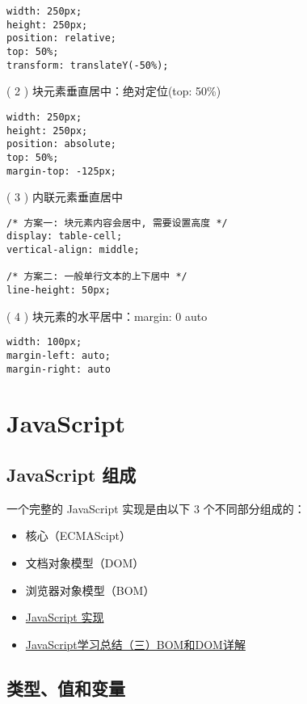 \begin{lstlisting}
width: 250px;
height: 250px;
position: relative;
top: 50%;
transform: translateY(-50%);
\end{lstlisting}

( 2 ) 块元素垂直居中：绝对定位(top: 50\%)

\begin{lstlisting}
width: 250px;
height: 250px;
position: absolute;
top: 50%;
margin-top: -125px;
\end{lstlisting}

( 3 ) 内联元素垂直居中

\begin{lstlisting}
/* 方案一: 块元素内容会居中, 需要设置高度 */
display: table-cell;
vertical-align: middle;

/* 方案二: 一般单行文本的上下居中 */
line-height: 50px;
\end{lstlisting}

( 4 ) 块元素的水平居中：margin: 0 auto

\begin{lstlisting}
width: 100px;
margin-left: auto;
margin-right: auto
\end{lstlisting}

\section{JavaScript}\label{javascript}

\subsection{JavaScript 组成}\label{javascript-ux7ec4ux6210}

一个完整的 JavaScript 实现是由以下 3 个不同部分组成的：

\begin{itemize}
\item
  核心（ECMAScipt）
\item
  文档对象模型（DOM）
\item
  浏览器对象模型（BOM）
\item
  \href{http://www.w3school.com.cn/js/pro_js_implement.asp}{JavaScript
  实现}
\item
  \href{http://segmentfault.com/a/1190000000654274}{JavaScript学习总结（三）BOM和DOM详解}
\end{itemize}

\subsection{类型、值和变量}\label{ux7c7bux578bux503cux548cux53d8ux91cf}

